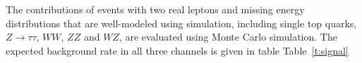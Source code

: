 

The contributions of events with two real leptons and missing energy
distributions that are well-modeled using simulation, including
single top quarks, $Z \to \tau\tau$, $WW$, $ZZ$ and $WZ$, are evaluated
using Monte Carlo simulation.
The expected background rate in all three channels is given in table Table~\ref{t:signal}

